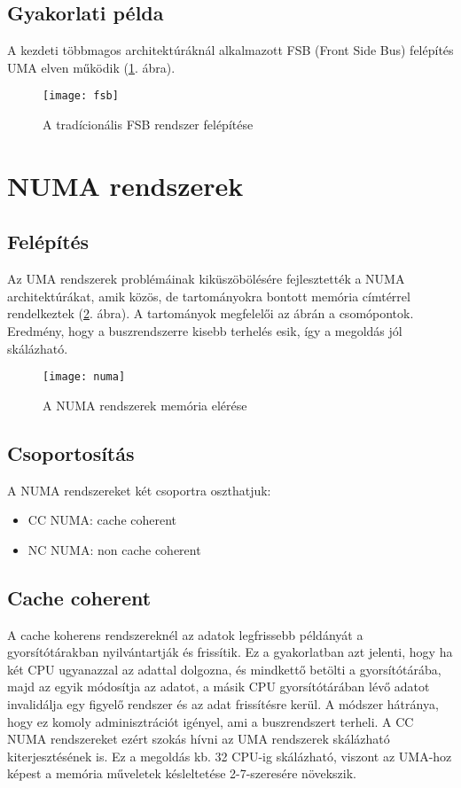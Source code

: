 \subsection{Gyakorlati példa}
A kezdeti többmagos architektúráknál alkalmazott FSB (Front Side Bus) felépítés UMA elven működik (\ref{fig:fsb}. ábra).
\begin{figure}[H]
    \texttt{[image: fsb]}
    \centering
    \caption{A tradícionális FSB rendszer felépítése}
    \label{fig:fsb}
\end{figure}

\section{NUMA rendszerek}
\subsection{Felépítés}
Az UMA rendszerek problémáinak kiküszöbölésére fejlesztették a NUMA architektúrákat, amik közös, de tartományokra bontott memória címtérrel rendelkeztek (\ref{fig:numa}. ábra).
A tartományok megfelelői az ábrán a csomópontok.
Eredmény, hogy a buszrendszerre kisebb terhelés esik, így a megoldás jól skálázható.
\begin{figure}[H]
    \texttt{[image: numa]}
    \centering
    \caption{A NUMA rendszerek memória elérése}
    \label{fig:numa}
\end{figure}
\subsection{Csoportosítás}
A NUMA rendszereket két csoportra oszthatjuk:
\begin{itemize}
    \item CC NUMA: cache coherent
    \item NC NUMA: non cache coherent
\end{itemize}

\subsection{Cache coherent}
A cache koherens rendszereknél az adatok legfrissebb példányát a gyorsítótárakban nyilvántartják és frissítik.
Ez a gyakorlatban azt jelenti, hogy ha két CPU ugyanazzal az adattal dolgozna, és mindkettő betölti a gyorsítótárába, majd az egyik módosítja az adatot, a másik CPU gyorsítótárában lévő adatot invalidálja egy figyelő rendszer és az adat frissítésre kerül.
A módszer hátránya, hogy ez komoly adminisztrációt igényel, ami a buszrendszert terheli.
A CC NUMA rendszereket ezért szokás hívni az UMA rendszerek skálázható kiterjesztésének is.
Ez a megoldás kb. 32 CPU-ig skálázható, viszont az UMA-hoz képest a memória műveletek késleltetése 2-7-szeresére növekszik.

